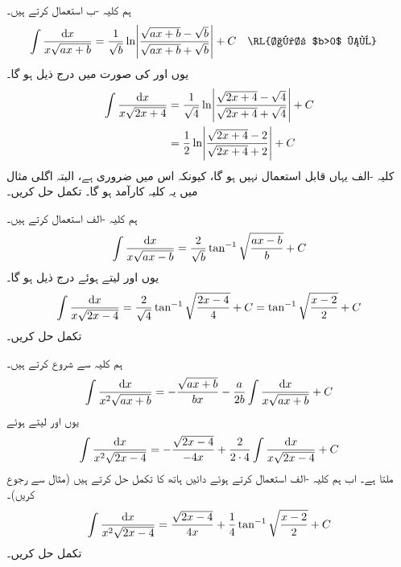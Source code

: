 ہم کلیہ -ب استعمال کرتے ہیں۔
\begin{align*}
\int\frac{\dif x}{x\sqrt{ax+b}}&=\frac{1}{\sqrt{b}}\ln\abs{\frac{\sqrt{ax+b}-\sqrt{b}}{\sqrt{ax+b}+\sqrt{b}}}+C&&\text{\RL{اگر $b>0$ ہو}}
\end{align*}
یوں  اور  کی صورت میں درج ذیل ہو گا۔
\begin{align*}
\int\frac{\dif x}{x\sqrt{2x+4}}&=\frac{1}{\sqrt{4}}\ln\abs{\frac{\sqrt{2x+4}-\sqrt{4}}{\sqrt{2x+4}+\sqrt{4}}}+C\\
&=\frac{1}{2}\ln\abs{\frac{\sqrt{2x+4}-2}{\sqrt{2x+4}+2}}+C
\end{align*}
کلیہ -الف یہاں قابل استعمال نہیں ہو گا،   کیونکہ  اس میں  ضروری ہے، البتہ اگلی مثال میں یہ  کلیہ کارآمد ہو گا۔
تکمل  حل کریں۔

ہم کلیہ -الف استعمال کرتے ہیں۔
\begin{align*}
\int\frac{\dif x}{x\sqrt{ax-b}}=\frac{2}{\sqrt{b}}\tan^{-1}\sqrt{\frac{ax-b}{b}}+C
\end{align*}
یوں  اور  لیتے ہوئے درج ذیل ہو گا۔
\begin{align*}
\int \frac{\dif x}{x\sqrt{2x-4}}=\frac{2}{\sqrt{4}}\tan^{-1}\sqrt{\frac{2x-4}{4}}+C=\tan^{-1}\sqrt{\frac{x-2}{2}}+C
\end{align*}
تکمل  حل کریں۔

ہم کلیہ  سے شروع کرتے ہیں۔
\begin{align*}
\int\frac{\dif x}{x^2\sqrt{ax+b}}=-\frac{\sqrt{ax+b}}{bx}-\frac{a}{2b}\int\frac{\dif x}{x\sqrt{ax+b}}+C
\end{align*}
یوں  اور  لیتے ہوئے
\begin{align*}
\int\frac{\dif x}{x^2\sqrt{2x-4}}=-\frac{\sqrt{2x-4}}{-4x}+\frac{2}{2\cdot 4}\int\frac{\dif x}{x\sqrt{2x-4}}+C
\end{align*}
ملتا ہے۔ اب ہم کلیہ -الف استعمال کرتے ہوئے دائیں ہاتھ کا  تکمل حل کرتے ہیں (مثال  سے رجوع کریں)۔
\begin{align*}
\int\frac{\dif x}{x^2\sqrt{2x-4}}=\frac{\sqrt{2x-4}}{4x}+\frac{1}{4}\tan^{-1}\sqrt{\frac{x-2}{2}}+C
\end{align*}
تکمل  حل کریں۔

